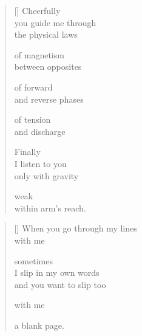 \documentclass[14pt]{extbook}
\newcommand*{\centeredornament}{\centerline{\pgfornament[width=6cm]{88}}}
\begin{document}

\newpage

\vspace*{-15mm}
\centeredornament
\vspace*{-7mm}


\settowidth{\versewidth}{you guide me through}

\begin{verse}[\versewidth]
  Cheerfully \\
  you guide me through \\
  the physical laws

  of magnetism \\
  between opposites

  of forward \\
  and reverse phases

  of tension \\
  and discharge

  Finally \\
  I listen to you \\
  only with gravity

  weak \\
  within arm's reach.
\end{verse}


\newpage

\vspace*{-15mm}
\centeredornament
\vspace*{-7mm}


\settowidth{\versewidth}{When you go through my lines}

\begin{verse}[\versewidth]
  When you go through my lines \\
  with me

  sometimes \\
  I slip in my own words \\
  and you want to slip too

  with me

  a blank page.
\end{verse}


\newpage
\end{document}
